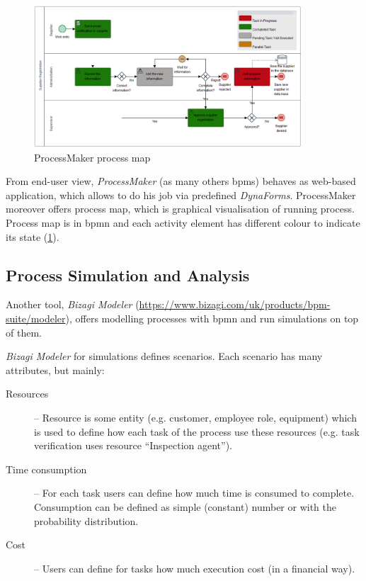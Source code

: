  \begin{figure}[ht!]
	\centering
    \includegraphics[width=10cm, keepaspectratio]{img/process-maker-map.PNG}
    \caption{ProcessMaker process map}
    \label{fig:process-maker-process-map}
\end{figure} 
 
 From end-user view, \textit{ProcessMaker} (as many others \gls{bpms}) behaves as web-based application, which allows to do his job via predefined \textit{DynaForms}. ProcessMaker moreover offers process map, which is graphical visualisation of running process. Process map is in \gls{bpmn} and each activity element has different colour to indicate its state (\cref{fig:process-maker-process-map}).
\subsection{Process Simulation and Analysis}
Another tool, \textit{Bizagi Modeler} (\href{https://www.bizagi.com/uk/products/bpm-suite/modeler}{https://www.bizagi.com/uk/products/bpm-suite/modeler}), offers modelling processes with \gls{bpmn} and run simulations on top of them.

\textit{Bizagi Modeler} for simulations defines scenarios. Each scenario has many attributes, but mainly:
\begin{description}
    \item[Resources] -- Resource is some entity (e.g. customer, employee role, equipment) which is used to define how each task of the process use these resources (e.g. task verification uses resource ``Inspection agent'').
    \item[Time consumption] -- For each task users can define how much time is consumed to complete. Consumption can be defined as simple (constant) number or with the probability distribution.
    \item[Cost] -- Users can define for tasks how much execution cost (in a financial way).    
\end{description}

